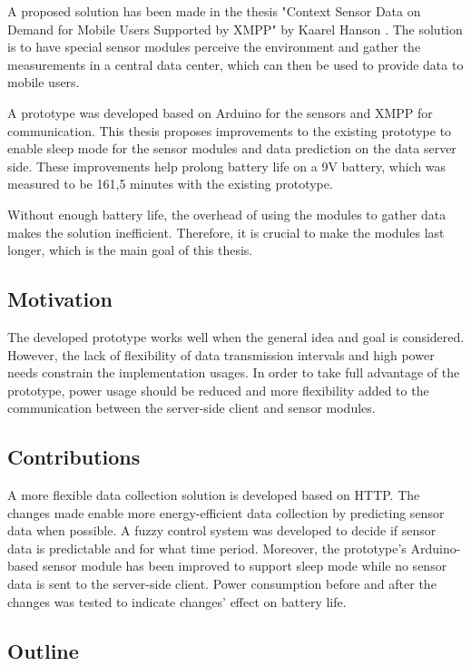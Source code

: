 A proposed solution has been made in the thesis "Context Sensor Data on Demand for Mobile Users Supported by XMPP" by Kaarel Hanson \cite{prev_thesis}. The solution is to have special sensor modules perceive the environment and gather the measurements in a central data center, which can then be used to provide data to mobile users. 

A prototype was developed based on Arduino for the sensors and XMPP for communication. This thesis proposes improvements to the existing prototype to enable sleep mode for the sensor modules and data prediction on the data server side. These improvements help prolong battery life on a 9V battery, which was measured to be 161,5 minutes with the existing prototype. 

Without enough battery life, the overhead of using the modules to gather data makes the solution inefficient. Therefore, it is crucial to make the modules last longer, which is the main goal of this thesis.

\subsection{Motivation}
The developed prototype \cite{prev_thesis} works well when the general idea and goal is considered. However, the lack of flexibility of data transmission intervals and high power needs constrain the implementation usages. In order to take full advantage of the prototype, power usage should be reduced and more flexibility added to the communication between the server-side client and sensor modules.  

\subsection{Contributions}

A more flexible data collection solution is developed based on HTTP. The changes made enable more energy-efficient data collection by predicting sensor data when possible. A fuzzy control system was developed to decide if sensor data is predictable and for what time period.  Moreover, the prototype's Arduino-based sensor module has been improved to support sleep mode while no sensor data is sent to the server-side client. Power consumption before and after the changes was tested to indicate changes' effect on battery life. 

\subsection{Outline}

